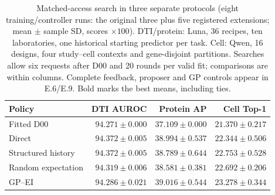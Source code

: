 \begin{table}[htbp]
\centering\small
\caption{Matched-access search in three separate protocols (eight training/controller runs: the original three plus five registered extensions; mean $\pm$ sample SD, scores $\times100$). DTI/protein: Luna, 36 recipes, ten laboratories, one historical starting predictor per task. Cell: Qwen, 16 designs, four study--cell contexts and gene-disjoint partitions. Searches allow six requests after D00 and 20 rounds per valid fit; comparisons are within columns. Complete feedback, proposer and GP controls appear in E.6/E.9. Bold marks the best means, including ties.}
\label{tab:author-review-current-search}
\begin{tabular}{lrrr}
\toprule
Policy & DTI AUROC & Protein AP & Cell Top-1 \\
\midrule
Fitted D00 & $94.271 \pm 0.000$ & $37.109 \pm 0.000$ & $21.370 \pm 0.217$ \\
Direct & $\mathbf{94.372 \pm 0.005}$ & $38.994 \pm 0.537$ & $22.344 \pm 0.506$ \\
Structured history & $\mathbf{94.372 \pm 0.005}$ & $38.789 \pm 0.644$ & $22.753 \pm 0.528$ \\
Random expectation & $94.319 \pm 0.006$ & $38.581 \pm 0.381$ & $22.692 \pm 0.206$ \\
GP--EI & $94.286 \pm 0.021$ & $\mathbf{39.016 \pm 0.544}$ & $\mathbf{23.278 \pm 0.344}$ \\
\bottomrule
\end{tabular}
\end{table}
